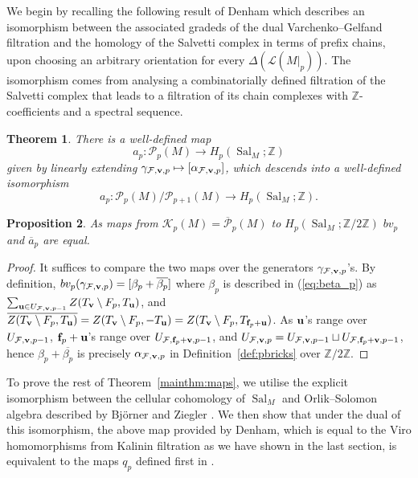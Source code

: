 \documentclass{amsart}
\newtheorem{theorem}{Theorem}[section]
\newtheorem{proposition}[theorem]{Proposition}
\newcommand\Fcal{{\mathcal F}}
\newcommand\Kcal{{\mathcal K}}
\newcommand\Lcal{{\mathcal L}}
\newcommand\Pcal{{\mathcal P}}
\newcommand\ff{{\bf f}}
\newcommand\vv{{\bf v}}
\newcommand\ZZ{{\mathbb Z}}
\newcommand\Ztwo{{\mathbb Z}/2{\mathbb Z}}
\newcommand\qbv{{q}}
\newcommand\abv{{a}}
\DeclareMathOperator{\Sal}{Sal}
\begin{document}
{We begin by recalling the following result of Denham which describes an isomorphism between the associated gradeds of the dual Varchenko--Gelfand filtration and the homology of the Salvetti complex in terms of prefix chains, upon choosing an arbitrary orientation for every $\Delta(\Lcal(M|_p))$.
The isomorphism comes from analysing a combinatorially defined filtration of the Salvetti complex that leads to a filtration of its chain complexes with $\ZZ$-coefficients and a spectral sequence. 

\begin{theorem} \label{thm:B1} \cite[Theorem~3.5]{Denham_OS}
There is a well-defined map $$\abv_p:\Pcal_p(M)\rightarrow H_p(\Sal_M;\ZZ)$$ given by linearly extending $\gamma_{\Fcal,\vv,p}\mapsto [\alpha_{\Fcal,\vv,p}]$, which descends into a well-defined isomorphism $$\abv_p:\Pcal_p(M)/\Pcal_{p+1}(M)\rightarrow H_p(\Sal_M;\ZZ).$$
\end{theorem}

\begin{proposition} \label{prop:a_eq_bv}
    As maps from $\Kcal_p(M)=\overline{\Pcal}_p(M)$  to $H_p(\Sal_M;\Ztwo)$ $bv_p$ and $\overline{\abv}_p$ are equal.
\end{proposition}

\begin{proof}
It suffices to compare the two maps over the generators $\gamma_{\Fcal,\vv,p}$'s. By definition,  $bv_p(\gamma_{\Fcal,\vv,p})=[\beta_p+\overline{\beta_p}]$ where $\beta_p$ is described in (\ref{eq:beta_p}) as $\sum_{{\bf u}\in U_{\Fcal,\vv,p-1}} Z(T_{\vv}\setminus F_{p},T_{\bf u})$, and $\overline{Z(T_{\vv}\setminus F_{p},T_{\bf u})}=Z(T_{\vv}\setminus F_{p},-T_{\bf u})=Z(T_{\vv}\setminus F_{p},T_{\ff_p+\bf u})$. As ${\bf u}$'s range over $U_{\Fcal,\vv,p-1}$, $\ff_p+{\bf u}$'s range over $U_{\Fcal,\ff_p+\vv,p-1}$, and $U_{\Fcal,\vv, p}=U_{\Fcal,\vv, p-1}\sqcup U_{\Fcal,\ff_p+\vv, p-1}$, hence $\beta_p+\overline{\beta_p}$ is precisely $\alpha_{\Fcal,\vv, p}$ in Definition~\ref{def:pbricks} over $\Ztwo$.
\end{proof}

To prove the rest of Theorem~\ref{mainthm:maps}, we utilise the explicit isomorphism between the cellular cohomology of $\Sal_M$ and Orlik--Solomon algebra described by Bj\"orner and Ziegler \cite{BZ92}. We then show that under the dual of this isomorphism, the above map provided by Denham, which is equal to the Viro homomorphisms from Kalinin filtration as we have shown in the last section, is equivalent to the maps $\qbv_p$ defined first in \cite{RS}.

}
\end{document}
